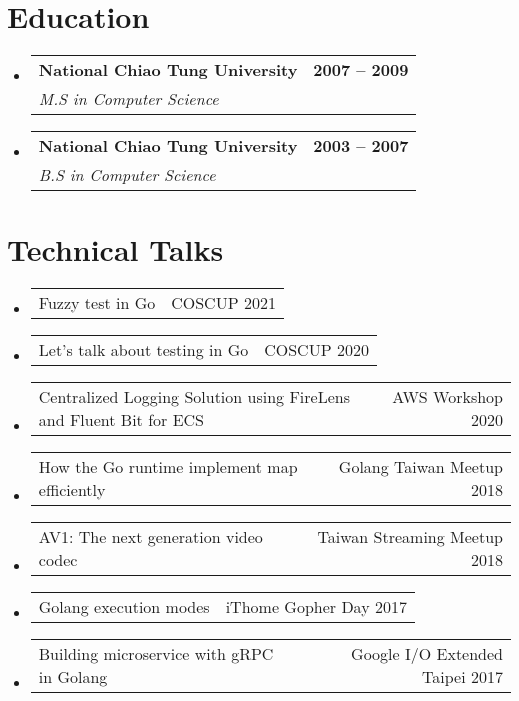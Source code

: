 \documentclass[letterpaper,11pt]{article}
\makeatletter
\newcommand{\resumeSubSubheading}[2]{
    \item
    \begin{tabular*}{1.0\textwidth}{l@{\extracolsep{\fill}}r}
      {#1} & \small{#2} \\
    \end{tabular*}\vspace{-7pt}
}
\newcommand{\resumeSubSubSubheading}[3]{
  \vspace{-2pt}\item
    \begin{tabular*}{1.0\textwidth}[t]{l@{\extracolsep{\fill}}r}
      \textbf{#1} & \textbf{\small #2} \\
      \textit{\small#3}  \\
    \end{tabular*}\vspace{-7pt}
}
\newcommand{\resumeSubHeadingListStart}{\begin{itemize}[leftmargin=0.0in, label={}]}
\newcommand{\resumeSubHeadingListEnd}{\end{itemize}}
\makeatother
\begin{document}
\vspace{-15pt}

\section{Education}
  \resumeSubHeadingListStart
    \resumeSubSubSubheading
      {National Chiao Tung University}{2007 -- 2009}
      {M.S in Computer Science}
    \resumeSubSubSubheading
      {National Chiao Tung University}{2003 -- 2007}
      {B.S in Computer Science}
  \resumeSubHeadingListEnd

\section{Technical Talks}
    \resumeSubHeadingListStart
        \resumeSubSubheading{Fuzzy test in Go}{COSCUP 2021}
        \resumeSubSubheading{Let’s talk about testing in Go}{COSCUP 2020}
        \resumeSubSubheading{Centralized Logging Solution using FireLens and Fluent Bit for ECS}{AWS Workshop 2020}
        \resumeSubSubheading{How the Go runtime implement map efficiently}{Golang Taiwan Meetup 2018}
        \resumeSubSubheading{AV1: The next generation video codec}{Taiwan Streaming Meetup 2018}
        \resumeSubSubheading{Golang execution modes}{iThome Gopher Day 2017}
        \resumeSubSubheading{Building microservice with gRPC in Golang}{Google I/O Extended Taipei 2017}
    \resumeSubHeadingListEnd

\end{document}
